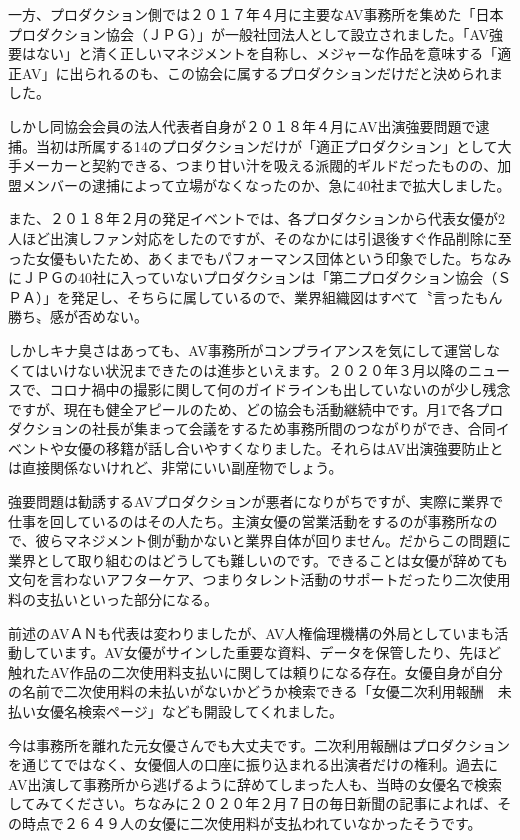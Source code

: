 \documentclass[12pt,UTF8]{ctexbook}
\begin{document}
一方、プロダクション側では２０１７年４月に主要なAV事務所を集めた「日本プロダクション協会（ＪＰＧ）」が一般社団法人として設立されました。「AV強要はない」と清く正しいマネジメントを自称し、メジャーな作品を意味する「適正AV」に出られるのも、この協会に属するプロダクションだけだと決められました。

しかし同協会会員の法人代表者自身が２０１８年４月にAV出演強要問題で逮捕。当初は所属する14のプロダクションだけが「適正プロダクション」として大手メーカーと契約できる、つまり甘い汁を吸える派閥的ギルドだったものの、加盟メンバーの逮捕によって立場がなくなったのか、急に40社まで拡大しました。

また、２０１８年２月の発足イベントでは、各プロダクションから代表女優が2人ほど出演しファン対応をしたのですが、そのなかには引退後すぐ作品削除に至った女優もいたため、あくまでもパフォーマンス団体という印象でした。ちなみにＪＰＧの40社に入っていないプロダクションは「第二プロダクション協会（ＳＰＡ）」を発足し、そちらに属しているので、業界組織図はすべて〝言ったもん勝ち〟感が否めない。

しかしキナ臭さはあっても、AV事務所がコンプライアンスを気にして運営しなくてはいけない状況まできたのは進歩といえます。２０２０年３月以降のニュースで、コロナ禍中の撮影に関して何のガイドラインも出していないのが少し残念ですが、現在も健全アピールのため、どの協会も活動継続中です。月1で各プロダクションの社長が集まって会議をするため事務所間のつながりができ、合同イベントや女優の移籍が話し合いやすくなりました。それらはAV出演強要防止とは直接関係ないけれど、非常にいい副産物でしょう。

強要問題は勧誘するAVプロダクションが悪者になりがちですが、実際に業界で仕事を回しているのはその人たち。主演女優の営業活動をするのが事務所なので、彼らマネジメント側が動かないと業界自体が回りません。だからこの問題に業界として取り組むのはどうしても難しいのです。できることは女優が辞めても文句を言わないアフターケア、つまりタレント活動のサポートだったり二次使用料の支払いといった部分になる。

前述のAVＡＮも代表は変わりましたが、AV人権倫理機構の外局としていまも活動しています。AV女優がサインした重要な資料、データを保管したり、先ほど触れたAV作品の二次使用料支払いに関しては頼りになる存在。女優自身が自分の名前で二次使用料の未払いがないかどうか検索できる「女優二次利用報酬　未払い女優名検索ページ」なども開設してくれました。

今は事務所を離れた元女優さんでも大丈夫です。二次利用報酬はプロダクションを通じてではなく、女優個人の口座に振り込まれる出演者だけの権利。過去にAV出演して事務所から逃げるように辞めてしまった人も、当時の女優名で検索してみてください。ちなみに２０２０年２月７日の毎日新聞の記事によれば、その時点で２６４９人の女優に二次使用料が支払われていなかったそうです。
\end{document}

